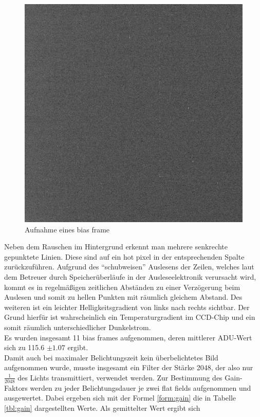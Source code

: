 \begin{figure}[h!]
\centering
        \includegraphics[width=.9\textwidth]{beiers_01.png}
\caption{ Aufnahme eines bias frame }
\label{fig:bias}
\end{figure}
Neben dem Rauschen im Hintergrund erkennt man mehrere senkrechte gepunktete Linien. Diese sind auf ein hot pixel in der entsprechenden Spalte zurückzuführen. Aufgrund des \enquote{schubweisen} Auslesens der Zeilen, welches laut dem Betreuer durch Speicherüberläufe in der Ausleseelektronik verursacht wird, kommt es in regelmäßigen zeitlichen Abständen zu einer Verzögerung beim Auslesen und somit zu hellen Punkten mit räumlich gleichem Abstand. Des weiteren ist ein leichter Helligkeitsgradient von links nach rechts sichtbar. Der Grund hierfür ist wahrscheinlich ein Temperaturgradient im CCD-Chip und ein somit räumlich unterschiedlicher Dunkelstrom. \\
Es wurden insgesamt 11 bias frames aufgenommen, deren mittlerer ADU-Wert sich zu 115.6 $ \pm 1.07$ ergibt. \\
Damit auch bei maximaler Belichtungszeit kein überbelichtetes Bild aufgenommen wurde, musste insgesamt ein Filter der Stärke 2048, der also nur $\frac{1}{2048}$ des Lichts transmittiert, verwendet werden. 
Zur Bestimmung des Gain-Faktors werden zu jeder Belichtungsdauer je zwei flat fields aufgenommen und ausgewertet. Dabei ergeben sich mit der Formel \eqref{form:gain} die in Tabelle \ref{tbl:gain} dargestellten Werte. Als gemittelter Wert ergibt sich 
